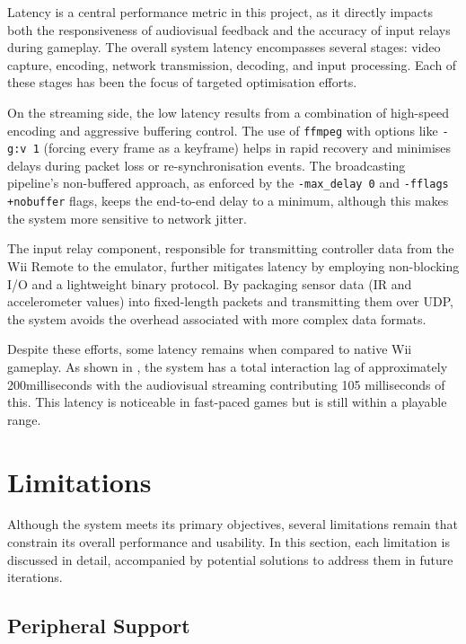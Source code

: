 Latency is a central performance metric in this project, as it directly impacts
both the responsiveness of audiovisual feedback and the accuracy of input relays
during gameplay. The overall system latency encompasses several stages: video
capture, encoding, network transmission, decoding, and input processing. Each of
these stages has been the focus of targeted optimisation efforts.

On the streaming side, the low latency results from a combination of
high-speed encoding and aggressive buffering control. The use of \texttt{ffmpeg}
with options like \texttt{-g:v 1} (forcing every frame as a keyframe) helps in
rapid recovery and minimises delays during packet loss or re-synchronisation
events. The broadcasting pipeline’s non-buffered approach, as enforced by the
\texttt{-max\_delay 0} and \texttt{-fflags +nobuffer} flags, keeps the
end-to-end delay to a minimum, although this makes the system more
sensitive to network jitter.

The input relay component, responsible for transmitting controller data from the
Wii Remote to the emulator, further mitigates latency by employing non-blocking
I/O and a lightweight binary protocol. By packaging sensor data (IR and
accelerometer values) into fixed-length packets and transmitting them over UDP,
the system avoids the overhead associated with more complex data formats.

Despite these efforts, some latency remains when compared to native Wii
gameplay. As shown in , the system
has a total interaction lag of approximately 200milliseconds with the audiovisual
streaming contributing 105 milliseconds of this. This latency is noticeable in
fast-paced games but is still within a playable range.

\section{Limitations}

Although the system meets its primary objectives, several limitations remain that constrain its overall performance and usability. In this section, each limitation is discussed in detail, accompanied by potential solutions to address them in future iterations.

\subsection{Peripheral Support}

